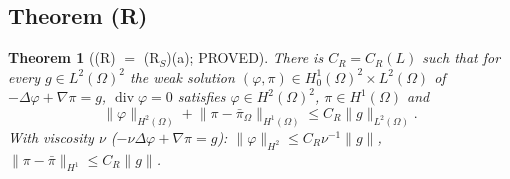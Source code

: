\documentclass[11pt,reqno]{amsart}
\theoremstyle{plain}
\newtheorem{theorem}{Theorem}[section]
\theoremstyle{definition}
\newcommand{\norm}[1]{\lVert #1\rVert}
\renewcommand{\div}{\operatorname{div}}
\begin{document}
\subsection{Theorem (R)}

\begin{theorem}[(R) $=$ (R$_S$)(a); PROVED]\label{t:R}
There is $C_R=C_R(L)$ such that for every $g\in L^2(\Omega)^2$ the weak solution $(\varphi,\pi)\in H^1_0(\Omega)^2\times L^2(\Omega)$ of $-\Delta\varphi+\nabla\pi=g$, $\div\varphi=0$ satisfies $\varphi\in H^2(\Omega)^2$, $\pi\in H^1(\Omega)$ and
\[
\norm\varphi_{H^2(\Omega)}+\norm{\pi-\bar\pi_\Omega}_{H^1(\Omega)}\le C_R\norm g_{L^2(\Omega)} .
\]
With viscosity $\nu$ ($-\nu\Delta\varphi+\nabla\pi=g$): $\norm\varphi_{H^2}\le C_R\nu^{-1}\norm g$, $\norm{\pi-\bar\pi}_{H^1}\le C_R\norm g$.
\end{theorem}
\end{document}
